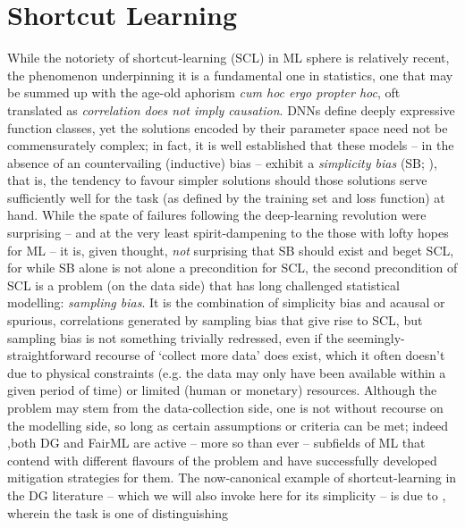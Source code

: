 \section{Shortcut Learning}\label{shortcut-learning}

While the notoriety of shortcut-learning (SCL) in ML sphere is relatively recent, the phenomenon
underpinning it is a fundamental one in statistics, one that may be summed up with the age-old
aphorism \emph{cum hoc ergo propter hoc}, oft translated as \emph{correlation does not imply
causation}.
%
DNNs define deeply expressive function classes, yet the solutions encoded by their parameter space
need not be commensurately complex; in fact, it is well established that these models -- in the
absence of an countervailing (inductive) bias -- exhibit a \emph{simplicity bias} (SB;
\cite{valle2018deep}), that is, the tendency to favour simpler solutions should those solutions
serve sufficiently well for the task (as defined by the training set and loss function) at hand.
%
While the spate of failures following the deep-learning revolution were surprising -- and at the
very least spirit-dampening to the those with lofty hopes for ML -- it is, given thought,
\emph{not} surprising that SB should exist and beget SCL, for while SB alone is not alone a
precondition for SCL, the second precondition  of SCL is a problem (on the data side) that has long
challenged statistical modelling: \emph{sampling bias}.
%
It is the combination of simplicity bias and acausal or spurious, correlations generated by
sampling bias that give rise to SCL, but sampling bias is not something trivially redressed, even
if the seemingly-straightforward recourse of `collect more data' does exist, which it often doesn't
due to physical constraints (e.g. the data may only have been available within a given period of
time) or limited (human or monetary) resources.
%
Although the problem may stem from the data-collection side, one is not without recourse on the
modelling side, so long as certain assumptions or criteria can be met;
%
indeed ,both DG and FairML are active -- more so than ever -- subfields of ML that contend with
different flavours of the problem and have successfully developed mitigation strategies for them.
%
The now-canonical example of shortcut-learning in the DG literature -- which we will also invoke
here for its simplicity -- is due to \cite{beery2018}, wherein the task is one of distinguishing
